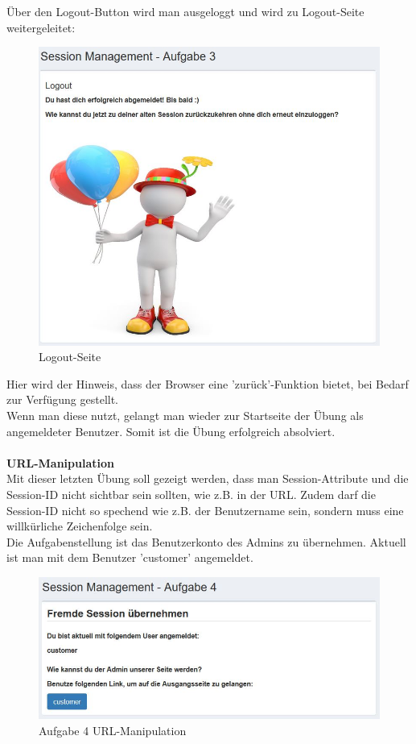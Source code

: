 Über den Logout-Button wird man ausgeloggt und wird zu Logout-Seite weitergeleitet:
\begin{figure}[H]
	\includegraphics[width=1.0\linewidth]{images/BrokenAuthenticationAndSessionManagement/Logout_Mitte}
	\caption[Logout]{Logout-Seite}
	\label{fig:Aufgabe 3 Abschluss}
\end{figure}
Hier wird der Hinweis, dass der Browser eine 'zurück'-Funktion bietet, bei Bedarf zur Verfügung gestellt.\\
Wenn man diese nutzt, gelangt man wieder zur Startseite der Übung als angemeldeter Benutzer. Somit ist die Übung erfolgreich absolviert.\\\\
\textbf{URL-Manipulation}\\
Mit dieser letzten Übung soll gezeigt werden, dass man Session-Attribute und die Session-ID nicht sichtbar sein sollten, wie z.B. in der URL. Zudem darf die Session-ID nicht so spechend wie z.B. der Benutzername sein, sondern muss eine willkürliche Zeichenfolge sein.\\
Die Aufgabenstellung ist das Benutzerkonto des Admins zu übernehmen. Aktuell ist man mit dem Benutzer 'customer' angemeldet.\\
\begin{figure}[H]
	\includegraphics[width=1.0\linewidth]{images/BrokenAuthenticationAndSessionManagement/URL_Start}
	\caption[URL]{Aufgabe 4 URL-Manipulation}
	\label{fig:Aufgabe 4 URL-Manipulation}
\end{figure}
